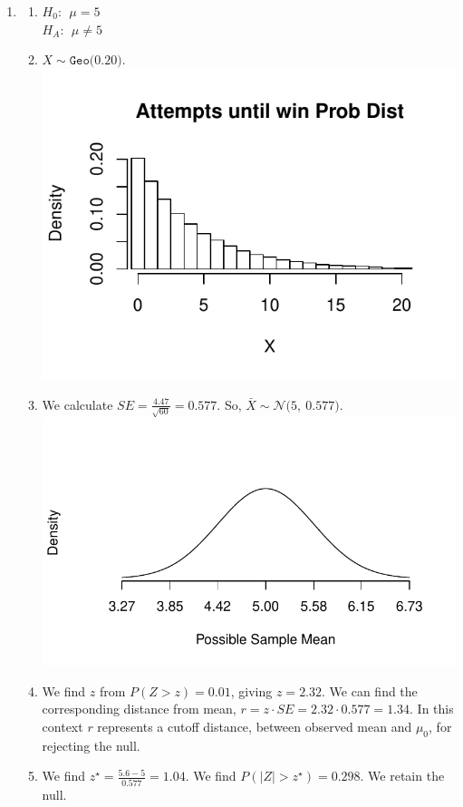 \documentclass[12pt,letterpaper]{article}
\newcommand{\N}[2]{\mathcal{N}\big(#1,~#2\big)}
\newcommand{\Geo}[1]{\texttt{Geo}\big(#1\big)}
\begin{document}
\begin{multicols}{2}
\begin{enumerate}
\newpage

\item \begin{enumerate}
\item $H_0:~~\mu = 5$\\
$H_A: ~~\mu \ne 5$
\item $X\sim \Geo{0.20}$.
\\\includegraphics[scale=0.7]{code/geo_hist}
\item We calculate $SE=\frac{4.47}{\sqrt{60}} = 0.577$. So, $\bar{X} \sim \N{5}{0.577}$.
\\ \includegraphics[scale=0.6]{code/geo_samp}
\item We find $z$ from $P(Z>z) = 0.01$, giving $z=2.32$. We can find the corresponding distance from mean, $r=z\cdot SE = 2.32 \cdot 0.577=1.34$. In this context $r$ represents a cutoff distance, between observed mean and $\mu_0$, for rejecting the null.
\item We find $z^{\star}=\frac{5.6-5}{0.577}=1.04$. We find $P(|Z| > z^{\star}) = 0.298$. We retain the null. 
\end{enumerate}



\end{enumerate}
\end{multicols}
\end{document}
